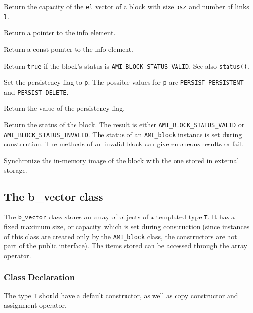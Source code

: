         {Return the capacity of the \lstinline|el| vector of a block with size 
        \lstinline|bsz| and number of links \lstinline|l|.}

         {Return a pointer to the info element.}
        
         {Return a const pointer to the 
        info element.}

         {Return \lstinline|true| if the block's 
        status is \lstinline|AMI_BLOCK_STATUS_VALID|. See also \lstinline|status()|.}

         {Set the persistency flag to
        \lstinline|p|. The possible values for \lstinline|p| are \lstinline|PERSIST_PERSISTENT| and \lstinline|PERSIST_DELETE|.}

         {Return the value of the 
        persistency flag.} 

         {Return the status of the
        block. The result is either
        \lstinline|AMI_BLOCK_STATUS_VALID| or 
      \lstinline|AMI_BLOCK_STATUS_INVALID|. The status of an \lstinline|AMI_block|
        instance is set during construction. The methods of an invalid
        block can give erroneous results or fail.}

         {Synchronize the in-memory image of the
        block with the one stored in external storage.}

   \etabb

\subsection{The  b\_vector class}

The \lstinline|b_vector| class stores an array of objects of a templated type
\lstinline|T|. It has a fixed maximum size, or capacity, which is set during
construction (since instances of this class are created only by the
\lstinline|AMI_block| class, the constructors are not part of the public
interface). The items stored can be accessed through the array operator.

\subsubsection{Class Declaration}
   \btabb 
         {The type \lstinline|T|
        should have a default constructor, as well as copy constructor and
        assignment operator.}
   \etabb

